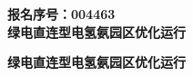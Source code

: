 \documentclass[zihao=-4,a4paper]{ctexart} %
\title{}
\author{}
\date{}
\begin{document}
	
	\thispagestyle{empty}
	\begin{center}
		
		
		\vspace{3cm}
		{ \bfseries 报名序号：004463} \\
		\vspace{3cm}
		{ \bfseries 绿电直连型电氢氨园区优化运行} \\
		\vspace{5cm}
		
	\end{center}
	\newpage
	
	\setcounter{page}{1}
	\begin{center}
		{ \bfseries 绿电直连型电氢氨园区优化运行}
	\end{center}
	\vspace{0.1cm}
	
\end{document}
